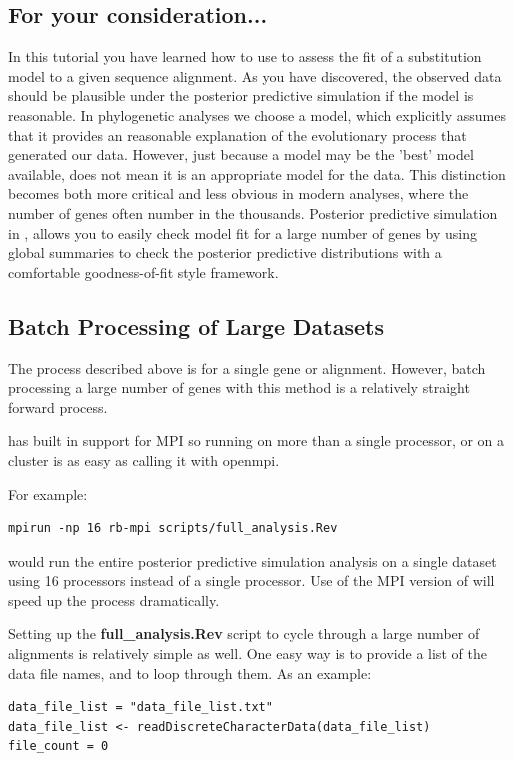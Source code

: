 \begin{equation *}
\begin{equation *}
\begin{equation *}
\section{For your consideration...}
In this tutorial you have learned how to use \RevBayes to assess the fit of a substitution model 
to a given sequence alignment. As you have discovered, the observed data should be plausible under 
the posterior predictive simulation if the model is reasonable. In phylogenetic analyses we choose a model, which explicitly assumes 
that it provides an reasonable explanation of the evolutionary process that generated our data. However, 
just because a model may be the 'best' model available, does not mean it is an appropriate model for the data. 
This distinction becomes both more critical and less obvious in modern analyses, where the 
number of genes often number in the thousands. Posterior predictive simulation in \RevBayes, allows you
to easily check model fit for a large number of genes by using global summaries to check the posterior 
predictive distributions with a comfortable goodness-of-fit style framework. 

\subsection{Batch Processing of Large Datasets}
The process described above is for a single gene or alignment. However, batch processing a large number of genes
with this method is a relatively straight forward process. 

\RevBayes has built in support for MPI so running \RevBayes on more than a single processor, or on a cluster is 
as easy as calling it with openmpi. 

For example:
{\tt \begin{snugshade*}
\begin{lstlisting}
mpirun -np 16 rb-mpi scripts/full_analysis.Rev
\end{lstlisting}
\end{snugshade*}}
would run the entire posterior predictive simulation analysis on a single dataset using 16 processors
instead of a single processor. Use of the MPI version of \RevBayes will speed up the process dramatically.

Setting up the \textbf{full\_analysis.Rev} script to cycle through a large number of alignments is relatively
simple as well. One easy way is to provide a list of the data file names, and to loop through 
them. As an example:

{\tt \begin{snugshade*}
\begin{lstlisting} 
data_file_list = "data_file_list.txt" 
data_file_list <- readDiscreteCharacterData(data_file_list)
file_count = 0


\end{lstlisting}
\end{snugshade*}}
\end{equation *}
\end{equation *}
\end{equation *}
